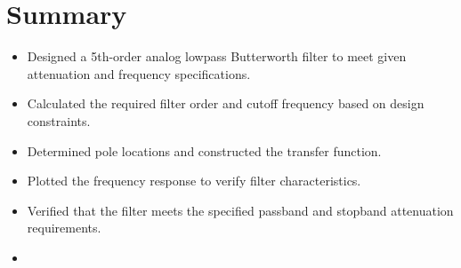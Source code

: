 \documentclass[12pt]{article}
\begin{document}
\section*{Summary}
\begin{itemize}
    \item Designed a 5th-order analog lowpass Butterworth filter to meet given attenuation and frequency specifications.
    \item Calculated the required filter order and cutoff frequency based on design constraints.
    \item Determined pole locations and constructed the transfer function.
    \item Plotted the frequency response to verify filter characteristics.
    \item Verified that the filter meets the specified passband and stopband attenuation requirements.
    \item 
\end{itemize}
\end{document}
